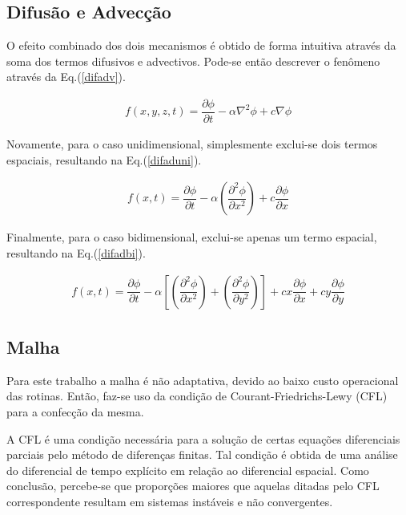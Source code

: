 \subsection{Difusão e Advecção}
\noindent

	O efeito combinado dos dois mecanismos é obtido de forma intuitiva através da soma dos termos difusivos e advectivos. Pode-se então descrever o fenômeno através da Eq.(\ref{difadv}).
	
\begin{align}
\label{difadv}
f(x,y,z,t) = \dfrac{\partial \phi}{\partial t} - \alpha \nabla^2 \phi + c \nabla \phi
\end{align}

	Novamente, para o caso unidimensional, simplesmente exclui-se dois termos espaciais, resultando na Eq.(\ref{difaduni}).

\begin{align}
\label{difaduni}
f(x,t) = \dfrac{\partial \phi}{\partial t} - \alpha \left(\dfrac{\partial^2 \phi}{\partial x^2}\right) + c \dfrac{\partial \phi}{\partial x}
\end{align}	

	Finalmente, para o caso bidimensional, exclui-se apenas um termo espacial, resultando na Eq.(\ref{difadbi}).

\begin{align}
\label{difadbi}
f(x,t) = \dfrac{\partial \phi}{\partial t} - \alpha \left[ \left(\dfrac{\partial^2 \phi}{\partial x^2}\right) + \left(\dfrac{\partial^2 \phi}{\partial y^2}\right)\right] + cx \dfrac{\partial \phi}{\partial x} + cy \dfrac{\partial \phi}{\partial y}
\end{align}	
	
\subsection{Malha}
\noindent

	Para este trabalho a malha é não adaptativa, devido ao baixo custo operacional das rotinas. Então, faz-se uso da condição de Courant-Friedrichs-Lewy (CFL) para a confecção da mesma.
	
	A CFL é uma condição necessária para a solução de certas equações diferenciais parciais pelo método de diferenças finitas. Tal condição é obtida de uma análise do diferencial de tempo explícito em relação ao diferencial espacial. Como conclusão, percebe-se que proporções maiores que aquelas ditadas pelo CFL correspondente resultam em sistemas instáveis e não convergentes.
	
